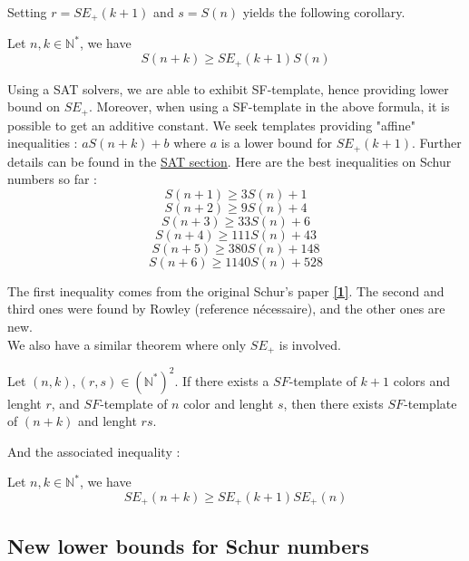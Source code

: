 Setting $r = SE_+(k+1)$ and $s = S(n)$ yields the following corollary. 

\begin{corollary}
	Let \(n, k \in \mathbb{N}^*\), we have \\
	\[ S(n+k) \geqslant SE_+(k+1)S(n) \]
\end{corollary}

Using a SAT solvers, we are able to exhibit SF-template,
hence providing lower bound on \(SE_+\). Moreover, when using 
a SF-template in the above formula, it is possible to get an additive constant. We seek templates providing "affine"
inequalities : \(aS(n+k) + b \) where \(a\) is a lower bound for \(SE_+(k+1)\). Further details can be found in the \hyperref[SAT]{SAT section}.
Here are the best inequalities on Schur numbers so far :
\[ S(n+1) \geqslant 3S(n) + 1 \]
\[ S(n+2) \geqslant 9S(n) + 4 \]
\[ S(n+3) \geqslant 33S(n) + 6 \]
\[ S(n+4) \geqslant 111S(n) + 43 \]
\[ S(n+5) \geqslant 380S(n) + 148 \]
\[ S(n+6) \geqslant 1140S(n) + 528 \]

The first inequality comes from the original Schur's paper \hyperlink{label1}{\textbf{[1]}}. The second and third ones were found by Rowley (reference nécessaire), 
and the other ones are new. \\

We also have a similar theorem where only \(SE_+\) is involved. 

\begin{theorem}
	Let $(n,k), (r,s) \in (\mathbb{N}^*)^2$. If there exists a \(SF\)-template of $k+1$ colors and lenght \(r\),
	and \(SF\)-template of \(n\) color and lenght \(s\), then there exists \(SF\)-template of \((n+k)\) and lenght \(rs\).
\end{theorem}

And the associated inequality :

\begin{corollary}
	Let \(n, k \in \mathbb{N}^*\), we have \\
	\[ SE_+(n+k) \geqslant SE_+(k+1)SE_+(n) \]
\end{corollary}


\subsection{New lower bounds for Schur numbers}

